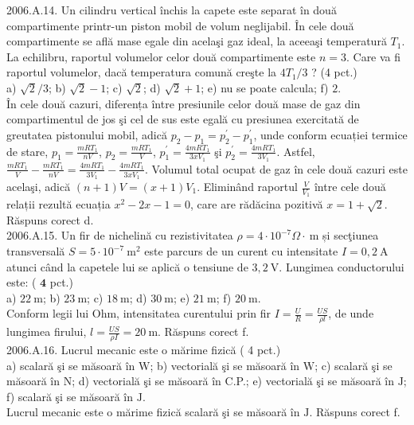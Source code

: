 2006.A.14. Un cilindru vertical închis la capete este separat în două compartimente printr-un piston mobil de volum neglijabil. În cele două compartimente se află mase egale din acelaşi gaz ideal, la aceeaşi temperatură $T_{1}$. La echilibru, raportul volumelor celor două compartimente este $n=3$. Care va fi raportul volumelor, dacă temperatura comună creşte la $4 T_{1} / 3$ ? (4 pct.)\\ a) $\sqrt{2} / 3$; b) $\sqrt{2}-1$; c) $\sqrt{2}$; d) $\sqrt{2}+1$; e) nu se poate calcula; f) $2$.\\ În cele două cazuri, diferența între presiunile celor două mase de gaz din compartimentul de jos şi cel de sus este egală cu presiunea exercitată de greutatea pistonului mobil, adică $p_{2}-p_{1}=p_{2}^{\prime}-p_{1}^{\prime}$, unde conform ecuației termice de stare, $p_{1}=\frac{m R T_{1}}{n V}$, $p_{2}=\frac{m R T_{1}}{V}$, $p_{1}^{\prime}=\frac{4 m R T_{1}}{3 x V_{1}}$ şi $p_{2}^{\prime}=\frac{4 m R T_{1}}{3 V_{1}}$. Astfel, $\frac{m R T_{1}}{V}-\frac{m R T_{1}}{n V}=\frac{4 m R T_{1}}{3 V_{1}}-\frac{4 m R T_{1}}{3 x V_{1}}$. Volumul total ocupat de gaz în cele două cazuri este acelaşi, adică $(n+1) V=(x+1) V_{1}$. Eliminând raportul $\frac{V}{V_{1}}$ între cele două relații rezultă ecuația $x^{2}-2 x-1=0$, care are rădăcina pozitivă $x=1+\sqrt{2}$. Răspuns corect d.\\

2006.A.15. Un fir de nichelină cu rezistivitatea $\rho=4 \cdot 10^{-7} \Omega \cdot \mathrm{~m}$ și secţiunea transversală $S=5 \cdot 10^{-7} \mathrm{~m}^{2}$ este parcurs de un curent cu intensitate $I=0,2 \mathrm{~A}$ atunci când la capetele lui se aplică o tensiune de $3,2 \mathrm{~V}$. Lungimea conductorului este: ( $\mathbf{4}$ pct.)\\ a) $22 \mathrm{~m}$; b) $23 \mathrm{~m}$; c) $18 \mathrm{~m}$; d) $30 \mathrm{~m}$; e) $21 \mathrm{~m}$; f) $20 \mathrm{~m}$.\\ Conform legii lui Ohm, intensitatea curentului prin fir $I=\frac{U}{R}=\frac{U S}{\rho l}$, de unde lungimea firului, $l=\frac{U S}{\rho I}=20 \mathrm{~m}$. Răspuns corect f.\\

2006.A.16. Lucrul mecanic este o mărime fizică ( 4 pct.)\\ a) scalară şi se măsoară în $\mathrm{W}$; b) vectorială şi se măsoară în $\mathrm{W}$; c) scalară şi se măsoară în $\mathrm{N}$; d) vectorială şi se măsoară în C.P.; e) vectorială şi se măsoară în $\mathrm{J}$; f) scalară şi se măsoară în $\mathrm{J}$.\\ Lucrul mecanic este o mărime fizică scalară şi se măsoară în $\mathrm{J}$. Răspuns corect f.\\

